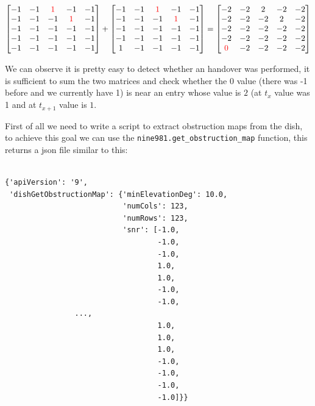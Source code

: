 \documentclass[IN,11pt,twoside,openright,bachelor,english]{tumthesis}
\begin{document}
\[
\begin{bmatrix}
-1 & -1 & \color{red}1 & -1 & -1 \\
-1 & -1 & -1 & \color{red}1 & -1 \\
-1 & -1 & -1 & -1 & -1 \\
-1 & -1 & -1 & -1 & -1 \\
-1 & -1 & -1 & -1 & -1 \\
\end{bmatrix}
+
\begin{bmatrix}
-1 & -1 & \color{red}1 & -1 & -1 \\
-1 & -1 & -1 & \color{red}1 & -1 \\
-1 & -1 & -1 & -1 & -1 \\
-1 & -1 & -1 & -1 & -1 \\
1 & -1 & -1 & -1 & -1 \\
\end{bmatrix}
=
\begin{bmatrix}
-2 & -2 & 2 & -2 & -2 \\
-2 & -2 & -2 & 2 & -2 \\
-2 & -2 & -2 & -2 & -2 \\
-2 & -2 & -2 & -2 & -2 \\
\color{red}0 & -2 & -2 & -2 & -2 \\
\end{bmatrix}

\]

We can observe it is pretty easy to detect whether an handover was performed, it is sufficient to sum the two matrices and check whether the $ 0 $ value (there was -1 before and we currently have 1) is near an entry whose value is $ 2 $ (at $ t_{x} $ value was 1 and at $ t_{x+1} $ value is $ 1 $. 

First of all we need to write a script to extract obstruction maps from the dish, to achieve this goal we can use the \texttt{nine981.get\_obstruction\_map} function, this returns a json file similar to this:

\begin{lstlisting}[caption={data from the \texttt{dish\_get\_obstruction\_map} function},captionpos=b]

{'apiVersion': '9',
 'dishGetObstructionMap': {'minElevationDeg': 10.0,
                           'numCols': 123,
                           'numRows': 123,
                           'snr': [-1.0,
                                   -1.0,
                                   -1.0,
                                   1.0,
                                   1.0,
                                   -1.0,
                                   -1.0,
				...,
                                   1.0,
                                   1.0,
                                   1.0,
                                   -1.0,
                                   -1.0,
                                   -1.0,
                                   -1.0]}}  
\end{lstlisting}
\end{document}
